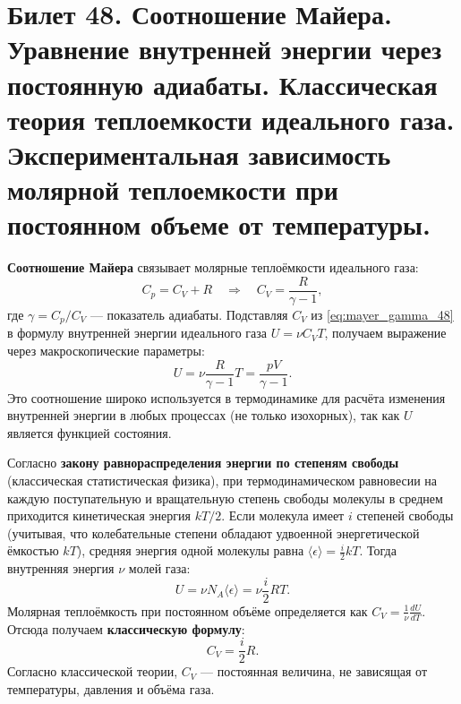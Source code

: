 \section{Билет 48. Соотношение Майера. Уравнение внутренней энергии через постоянную адиабаты. Классическая теория теплоемкости идеального газа. Экспериментальная зависимость молярной теплоемкости при постоянном объеме от температуры.}

\begin{definition}
\textbf{Соотношение Майера} связывает молярные теплоёмкости идеального газа:
\begin{equation}
    C_p = C_V + R \quad \Rightarrow \quad C_V = \frac{R}{\gamma - 1}, \label{eq:mayer_gamma_48}
\end{equation}
где $\gamma = C_p/C_V$ --- показатель адиабаты. Подставляя $C_V$ из \eqref{eq:mayer_gamma_48} в формулу внутренней энергии идеального газа $U = \nu C_V T$, получаем выражение через макроскопические параметры:
\begin{equation}
    U = \nu \frac{R}{\gamma - 1} T = \frac{pV}{\gamma - 1}. \label{eq:U_gamma_48}
\end{equation}
Это соотношение широко используется в термодинамике для расчёта изменения внутренней энергии в любых процессах (не только изохорных), так как $U$ является функцией состояния.
\end{definition}

\begin{theorem}
Согласно \textbf{закону равнораспределения энергии по степеням свободы} (классическая статистическая физика), при термодинамическом равновесии на каждую поступательную и вращательную степень свободы молекулы в среднем приходится кинетическая энергия $kT/2$.
Если молекула имеет $i$ степеней свободы (учитывая, что колебательные степени обладают удвоенной энергетической ёмкостью $kT$), средняя энергия одной молекулы равна $\langle \epsilon \rangle = \frac{i}{2} kT$. Тогда внутренняя энергия $\nu$ молей газа:
\begin{equation}
    U = \nu N_A \langle \epsilon \rangle = \nu \frac{i}{2} R T.
\end{equation}
Молярная теплоёмкость при постоянном объёме определяется как $C_V = \frac{1}{\nu} \frac{dU}{dT}$. Отсюда получаем \textbf{классическую формулу}:
\begin{equation}
    C_V = \frac{i}{2} R. \label{eq:classical_Cv}
\end{equation}
Согласно классической теории, $C_V$ --- постоянная величина, не зависящая от температуры, давления и объёма газа.
\end{theorem}

